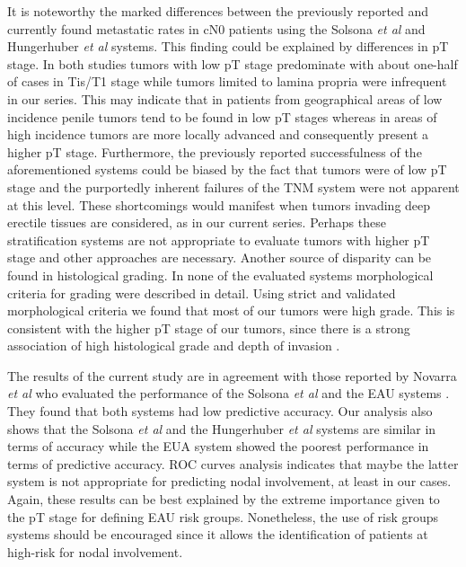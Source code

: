 \documentclass[11pt,letterpaper]{article}\usepackage[]{graphicx}\usepackage[]{color}
\begin{document}
\begin{multicols}{2}
It is noteworthy the marked differences between the previously reported and currently found metastatic rates in cN0 patients using the Solsona \emph{et al} and Hungerhuber \emph{et al} systems. This finding could be explained by differences in pT stage. In both studies tumors with low pT stage predominate with about one-half of cases in Tis/T1 stage while tumors limited to lamina propria were infrequent in our series. This may indicate that in patients from geographical areas of low incidence penile tumors tend to be found in low pT stages whereas in areas of high incidence tumors are more locally advanced and consequently present a higher pT stage. Furthermore, the previously reported successfulness of the aforementioned systems could be biased by the fact that tumors were of low pT stage and the purportedly inherent failures of the TNM system were not apparent at this level. These shortcomings would manifest when tumors invading deep erectile tissues are considered, as in our current series. Perhaps these stratification systems are not appropriate to evaluate tumors with higher pT stage and other approaches are necessary. Another source of disparity can be found in histological grading. In none of the evaluated systems morphological criteria for grading were described in detail. Using strict and validated morphological criteria \cite{Chaux2009b} we found that most of our tumors were high grade. This is consistent with the higher pT stage of our tumors, since there is a strong association of high histological grade and depth of invasion \cite{Guimaraes2009}. 

The results of the current study are in agreement with those reported by Novarra \emph{et al} who evaluated the performance of the Solsona \emph{et al} and the EAU systems \cite{Novara2008}. They found that both systems had low predictive accuracy. Our analysis also shows that the Solsona \emph{et al} and the Hungerhuber \emph{et al} systems are similar in terms of accuracy while the EUA system showed the poorest performance in terms of predictive accuracy. ROC curves analysis indicates that maybe the latter system is not appropriate for predicting nodal involvement, at least in our cases. Again, these results can be best explained by the extreme importance given to the pT stage for defining EAU risk groups. Nonetheless, the use of risk groups systems should be encouraged since it allows the identification of patients at high-risk for nodal involvement.


\end{multicols}
\end{document}
